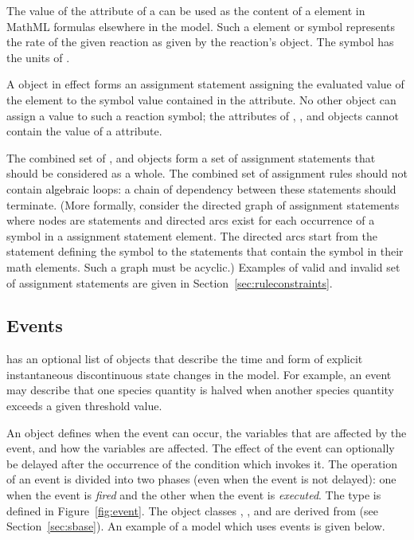 The value of the  attribute of a \Reaction can be
used as the content of a  element in MathML formulas
elsewhere in the model. Such a  element or symbol
represents the rate of the given reaction as given by the
reaction's \KineticLaw object.  The symbol has the units
of .

A \KineticLaw object in effect forms an assignment statement
assigning the evaluated value of the  element to the
symbol value contained in the \Reaction {} attribute.  No
other object can assign a value to such a reaction symbol; \ie
the  attributes of \InitialAssignment, \RateRule,
\AssignmentRule and \EventAssignment objects cannot contain the
value of a \Reaction {} attribute.

The combined set of \InitialAssignment, \AssignmentRule and
\KineticLaw objects form a set of assignment statements that
should be considered as a whole.  The combined set of assignment
rules should not contain \textcolor{black}{algebraic} loops: a chain of dependency
between these statements should terminate.  (More formally,
consider the directed graph of assignment statements where nodes
are statements and directed arcs exist for each occurrence of a
symbol in a assignment statement  element. The directed
arcs start from the statement defining the symbol to the
statements that contain the symbol in their math elements. Such a
graph must be acyclic.)  Examples of valid and invalid set of
assignment statements are given in
Section~\ref{sec:ruleconstraints}.


\subsection{Events}
\label{sec:events}

\Model has an optional list of \Event objects that describe the
time and form of explicit instantaneous discontinuous state
changes in the model.  For example, an event may describe that one
species quantity is halved when another species quantity exceeds a
given threshold value.

An \Event object defines when the event can occur, the
variables that are affected by the event, and how the variables
are affected.  The effect of the event can optionally be delayed
after the occurrence of the condition which invokes it.  The
operation of an event is divided into two phases (even
when the event is not delayed): one when the event is \emph{fired}
and the other when the event is \emph{executed}. The \Event type
is defined in Figure~\vref{fig:event}.  The
  object classes
  \Event, \Trigger, \Delay and \EventAssignment are derived from
  \SBase{} (see Section~\ref{sec:sbase}).  An example
of a model which uses events is given below.

